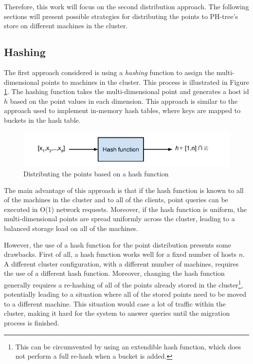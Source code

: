 \documentclass[11pt,a4paper]{globis-book}
\begin{document}
Therefore, this work will focus on the second distribution approach. The following sections will present possible strategies for distributing the points to PH-tree's store on different machines in the cluster.  

\subsection{Hashing}

The first approach considered is using a \textit{hashing} function to assign the multi-dimensional points to machines in the cluster. This process is illustrated in Figure \ref{fig:hashing}. The hashing function takes the multi-dimensional point and generates a host id $h$ based on the point values in each dimension. This approach is similar to the approach used to implement in-memory hash tables, where keys are mapped to buckets in the hash table.

\begin{figure}[h]
    \centering 
    \includegraphics[scale=0.9]{images/hashing}
    \caption{Distributing the points based on a hash function}
    \label{fig:hashing}
\end{figure}

The main advantage of this approach is that if the hash function is known to all of the machines in the cluster and to all of the clients, point queries can be executed in O(1) network requests. Moreover, if the hash function is uniform, the multi-dimensional points are spread uniformly across the cluster, leading to a balanced storage load on all of the machines.

However, the use of a hash function for the point distribution presents some drawbacks. First of all, a hash function works well for a fixed number of hosts $n$. A different cluster configuration, with a different number of machines, requires the use of a different hash function. Moreover, changing the hash function generally requires a re-hashing of all of the points already stored in the cluster\footnote{This can be circumvented by using an extendible hash function, which does not perform a full re-hash when a bucket is added.}, potentially leading to a situation where all of the stored points need to be moved to a different machine. This situation would case a lot of traffic within the cluster, making it hard for the system to answer queries until the migration process is finished.
\end{document}
